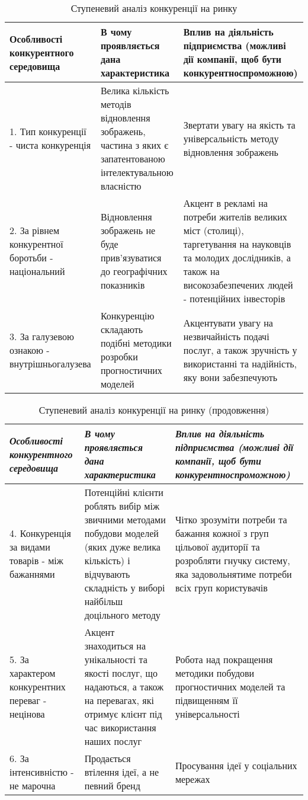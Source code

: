 \begin{table}[h!]
\fontsize{12pt}{12pt}\selectfont
	\begin{tabularx}{\textwidth}{|X|X|X|}
    \hline
    Особливості конкурентного середовища & В чому проявляється дана характеристика & Вплив на діяльність підприємства (можливі дії компанії, щоб бути конкурентноспроможною) \\ \hline
    1. Тип конкуренції - чиста конкуренція & Велика кількість методів відновлення зображень, частина з яких є запатентованою інтелектувальною власністю & Звертати увагу на якість та універсальність методу відновлення зображень \\ \hline 
    2. За рівнем конкурентної боротьби - національний & Відновлення зображень не буде прив'язуватися до географічних показників & Акцент в рекламі на потреби жителів великих міст (столиці), таргетування на науковців та молодих дослідників, а також на високозабезпечених людей - потенційних інвесторів \\ \hline 
    3. За галузевою ознакою - внутрішньогалузева & Конкуренцію складають подібні методики розробки прогностичних моделей & Акцентувати увагу на незвичайність подачі послуг, а також зручність у використанні та надійність, яку вони забезпечують \\
    \hline
    \end{tabularx}
\caption{Ступеневий аналіз конкуренції на ринку} \label{tab:stab_4_1}
\end{table}

\begin{table}[h!]
\fontsize{12pt}{12pt}\selectfont
    \begin{tabularx}{\textwidth}{|X|X|X|}
    \hline
    \textit{Особливості конкурентного середовища} & \textit{В чому проявляється дана характеристика} & \textit{Вплив на діяльність підприємства (можливі дії компанії, щоб бути конкурентноспроможною)} \\ \hline
    4. Конкуренція за видами товарів - між бажаннями & Потенційні клієнти роблять вибір між звичними методами побудови моделей (яких дуже велика кількість) і відчувають складність у виборі найбільш доцільного методу & Чітко зрозуміти потреби та бажання кожної з груп цільової аудиторії та розробляти гнучку систему, яка задовольнятиме потреби всіх груп користувачів \\ \hline 
    5. За характером конкурентних переваг - нецінова & Акцент знаходиться на унікальності та якості послуг, що надаються, а також на перевагах, які отримує клієнт під час використання наших послуг & Робота над покращення методики побудови прогностичних моделей та підвищенням її універсальності \\ \hline 
    6. За інтенсивністю - не марочна & Продається втілення ідеї, а не певний бренд & Просування ідеї у соціальних мережах \\
    \hline
    \end{tabularx}
\caption{Ступеневий аналіз конкуренції на ринку (продовження)} \label{tab:stab_4_2}
\end{table}

